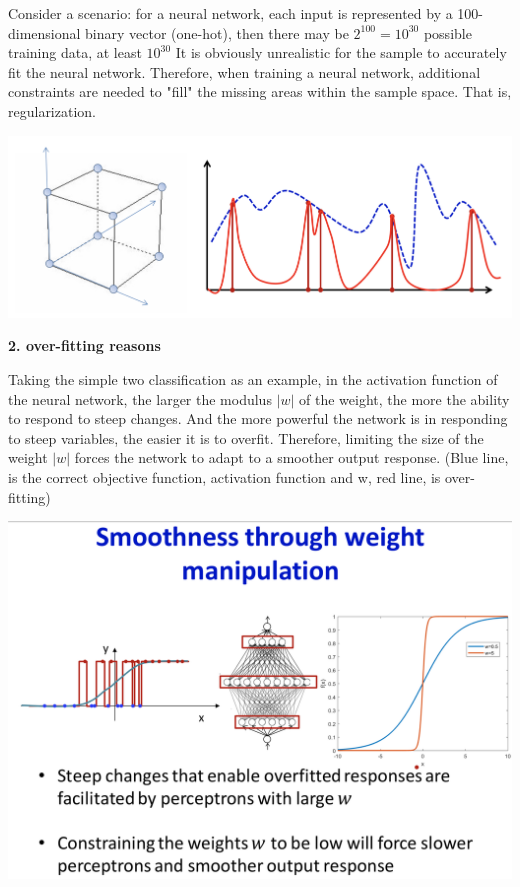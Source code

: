 \documentclass{article}
\begin{document}
	Consider a scenario: for a neural network, each input is represented by a 100-dimensional binary vector (one-hot), then there may be $2^100=10^30$ possible training data, at least $10^30$ It is obviously unrealistic for the sample to accurately fit the neural network. Therefore, when training a neural network, additional constraints are needed to "fill" the missing areas within the sample space. That is, regularization.
	
	\includegraphics[scale=0.2]{97.png}
	
	\textbf{2. over-fitting reasons}
	
	Taking the simple two classification as an example, in the activation function of the neural network, the larger the modulus $|w|$ of the weight, the more the ability to respond to steep changes. And the more powerful the network is in responding to steep variables, the easier it is to overfit. Therefore, limiting the size of the weight $|w|$ forces the network to adapt to a smoother output response. (Blue line, is the correct objective function, activation function and w, red line, is over-fitting)
	
	\includegraphics[scale=0.2]{98.png}
	
\end{document}
